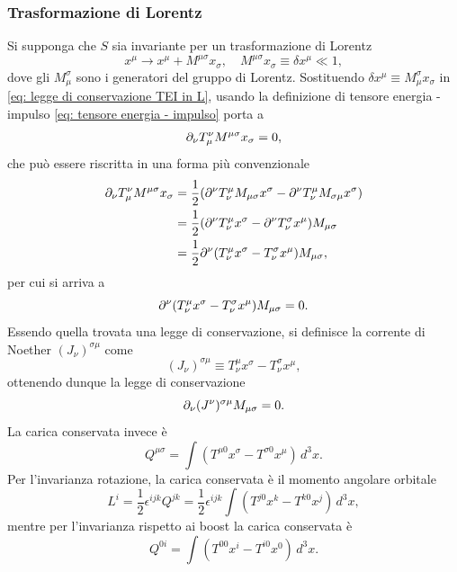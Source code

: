 \subsubsection{Trasformazione di Lorentz}
Si supponga che $S$ sia invariante per un trasformazione di Lorentz 
\begin{equation}
    x^\mu\to x^\mu + M^{\mu\sigma} x_\sigma,\quad M^{\mu\sigma} x_\sigma \equiv \delta x^\mu \ll 1,
\end{equation}
dove gli $M_\mu^\sigma$ sono i generatori del gruppo di Lorentz. Sostituendo $\delta x^\mu \equiv M_\mu^\sigma x_\sigma$ in \eqref{eq: legge di conservazione TEI in L}, usando la definizione di tensore energia - impulso \eqref{eq: tensore energia - impulso} porta a 
\begin{equation}
    \partial_\nu T^\nu_\mu M^{\mu\sigma}x_\sigma = 0,
\end{equation}
che può essere riscritta in una forma più convenzionale 
\begin{equation}
    \begin{split}
        \partial_\nu T^\nu_\mu M^{\mu\sigma}x_\sigma &= \frac{1}{2}(\partial^\nu T^\mu_\nu M_{\mu\sigma}x^\sigma - \partial^\nu T_\nu^\mu M_{\sigma\mu}x^\sigma) \\
        &= \frac{1}{2}(\partial^\nu T_\nu^\mu x^\sigma - \partial^\nu T_\nu ^\sigma x^\mu)M_{\mu\sigma} \\
        &= \frac{1}{2}\partial^\nu(T_\nu^\mu x^\sigma - T_\nu ^\sigma x^\mu)M_{\mu\sigma},
    \end{split} 
\end{equation}
per cui si arriva a
\begin{equation}
    \partial^\nu(T_\nu^\mu x^\sigma - T_\nu ^\sigma x^\mu)M_{\mu\sigma} = 0.
\end{equation}
Essendo quella trovata una legge di conservazione, si definisce la corrente di Noether $(J_\nu)^{\sigma\mu}$ come
\begin{equation}
    (J_\nu)^{\sigma\mu} \equiv T_\nu^\mu x^\sigma - T_\nu ^\sigma x^\mu,
\end{equation}
ottenendo dunque la legge di conservazione
\begin{equation}
    \partial_\nu(J^\nu)^{\sigma\mu}M_{\mu\sigma} = 0.
\end{equation}
La carica conservata invece è
\begin{equation}
    Q^{\mu\sigma} = \int (T^{\mu0}x^\sigma - T^{\sigma0}x^\mu)\,d^3x.
\end{equation}
Per l'invarianza rotazione, la carica conservata è il momento angolare orbitale
\begin{equation}
    L^i = \frac{1}{2}\epsilon^{ijk}Q^{jk} = \frac{1}{2}\epsilon^{ijk}\int (T^{j0}x^k - T^{k0}x^j)\,d^3x,
\end{equation}
mentre per l'invarianza rispetto ai boost la carica conservata è 
\begin{equation}
    Q^{0i} = \int (T^{00}x^i - T^{i0}x^0)\,d^3x.
\end{equation}

